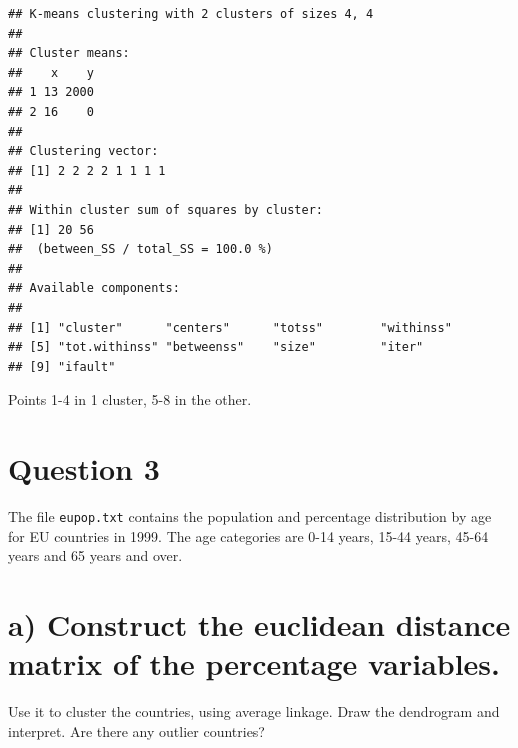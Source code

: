 \documentclass[]{article}
\newenvironment{Shaded}{\begin{snugshade}}{\end{snugshade}}
\newcommand{\DecValTok}[1]{\textcolor[rgb]{0.00,0.00,0.81}{#1}}
\newcommand{\KeywordTok}[1]{\textcolor[rgb]{0.13,0.29,0.53}{\textbf{#1}}}
\newcommand{\NormalTok}[1]{#1}
\newcommand{\OperatorTok}[1]{\textcolor[rgb]{0.81,0.36,0.00}{\textbf{#1}}}
\newcommand{\StringTok}[1]{\textcolor[rgb]{0.31,0.60,0.02}{#1}}
\begin{document}
\begin{verbatim}
## K-means clustering with 2 clusters of sizes 4, 4
## 
## Cluster means:
##    x    y
## 1 13 2000
## 2 16    0
## 
## Clustering vector:
## [1] 2 2 2 2 1 1 1 1
## 
## Within cluster sum of squares by cluster:
## [1] 20 56
##  (between_SS / total_SS = 100.0 %)
## 
## Available components:
## 
## [1] "cluster"      "centers"      "totss"        "withinss"    
## [5] "tot.withinss" "betweenss"    "size"         "iter"        
## [9] "ifault"
\end{verbatim}

Points 1-4 in 1 cluster, 5-8 in the other.

\hypertarget{question-3}{%
\section{Question 3}\label{question-3}}

The file \texttt{eupop.txt} contains the population and percentage
distribution by age for EU countries in 1999. The age categories are
0-14 years, 15-44 years, 45-64 years and 65 years and over.

\hypertarget{a-construct-the-euclidean-distance-matrix-of-the-percentage-variables.}{%
\section{a) Construct the euclidean distance matrix of the percentage
variables.}\label{a-construct-the-euclidean-distance-matrix-of-the-percentage-variables.}}

Use it to cluster the countries, using average linkage. Draw the
dendrogram and interpret. Are there any outlier countries?

\begin{Shaded}
\end{Shaded}
\end{document}
